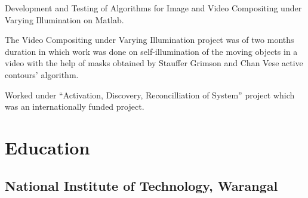\documentclass[letterpaper]{deedy-resume} %
\begin{document}
\begin{minipage}[t]{0.66\textwidth}


\begin{tightitemize}
\item Development and Testing of Algorithms for Image and Video Compositing under Varying Illumination on Matlab.
\item The Video Compositing under Varying Illumination project was of two months duration in which work was done on self-illumination of the moving objects in a video with the help of masks obtained by Stauffer Grimson and Chan Vese active contours’ algorithm.
\end{tightitemize}

\sectionspace %



\begin{tightitemize}
\item Worked under “Activation, Discovery, Reconcilliation of System” project which was an internationally funded project.
\end{tightitemize}
\sectionspace %


\section{Education}

\subsection{National Institute of Technology, Warangal}



\end{minipage}
\end{document}
